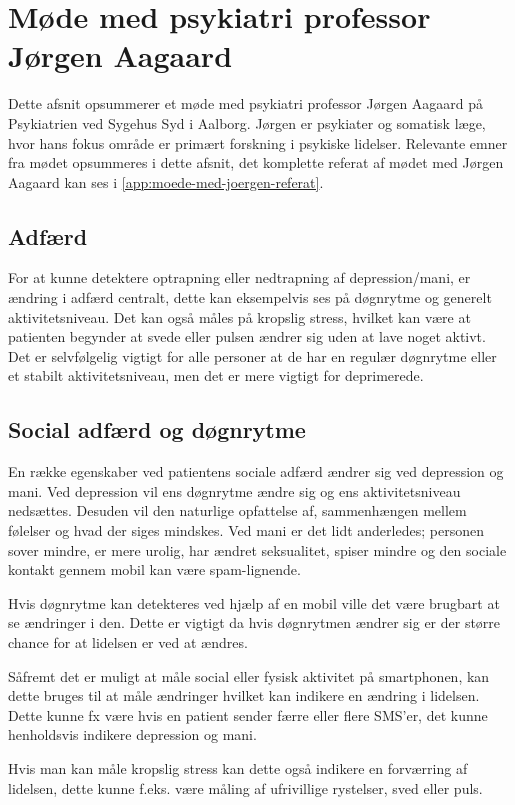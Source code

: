 \section{Møde med psykiatri professor Jørgen Aagaard}\label{sec:moede-med-joergen}
Dette afsnit opsummerer et møde med psykiatri professor Jørgen Aagaard på Psykiatrien ved Sygehus Syd i Aalborg. 
Jørgen er psykiater og somatisk læge, hvor hans fokus område er primært forskning i psykiske lidelser.
Relevante emner fra mødet opsummeres i dette afsnit, det komplette referat af mødet med Jørgen Aagaard kan ses i \cref{app:moede-med-joergen-referat}.

\subsection{Adfærd}
For at kunne detektere optrapning eller nedtrapning af depression/mani, er ændring i adfærd centralt, dette kan eksempelvis ses på døgnrytme og generelt aktivitetsniveau. 
Det kan også måles på kropslig stress, hvilket kan være at patienten begynder at svede eller pulsen ændrer sig uden at lave noget aktivt. 
Det er selvfølgelig vigtigt for alle personer at de har en regulær døgnrytme eller et stabilt aktivitetsniveau, men det er mere vigtigt for deprimerede.

\subsection{Social adfærd og døgnrytme}
En række egenskaber ved patientens sociale adfærd ændrer sig ved depression og mani.
Ved depression vil ens døgnrytme ændre sig og ens aktivitetsniveau nedsættes.
Desuden vil den naturlige opfattelse af, sammenhængen mellem følelser og hvad der siges mindskes.
Ved mani er det lidt anderledes; personen sover mindre, er mere urolig, har ændret seksualitet, spiser mindre og den sociale kontakt gennem mobil kan være spam-lignende. 

Hvis døgnrytme kan detekteres ved hjælp af en mobil ville det være brugbart at se ændringer i den.
Dette er vigtigt da hvis døgnrytmen ændrer sig er der større chance for at lidelsen er ved at ændres.

Såfremt det er muligt at måle social eller fysisk aktivitet på smartphonen, kan dette bruges til at måle ændringer hvilket kan indikere en ændring i lidelsen.
Dette kunne fx være hvis en patient sender færre eller flere SMS'er, det kunne henholdsvis indikere depression og mani.

Hvis man kan måle kropslig stress kan dette også indikere en forværring af lidelsen, dette kunne f.eks. være måling af ufrivillige rystelser, sved eller puls. 

